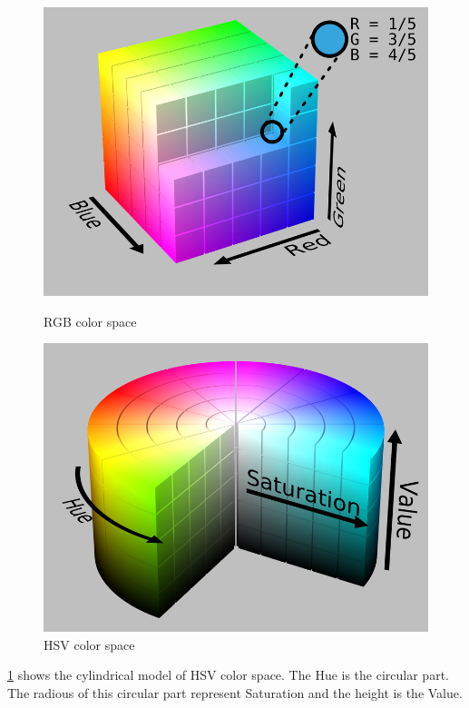 \begin{figure}[htbp]
\begin{minipage}[t]{0.45\linewidth}
    \includegraphics[width=\linewidth]{images/RGB.png}
    \caption{RGB color space}
    \label{f:rgb}
\end{minipage}
    \hfill
\begin{minipage}[t]{0.45\linewidth}
    \includegraphics[width=\linewidth]{images/HSV.png}
    \caption{HSV color space}
    \label{f:hsv}
\end{minipage} 
\end{figure}

\ref{f:hsv} shows the cylindrical model of HSV color space.
The Hue is the circular part.
The radious of this circular part represent Saturation and the height is the Value.

